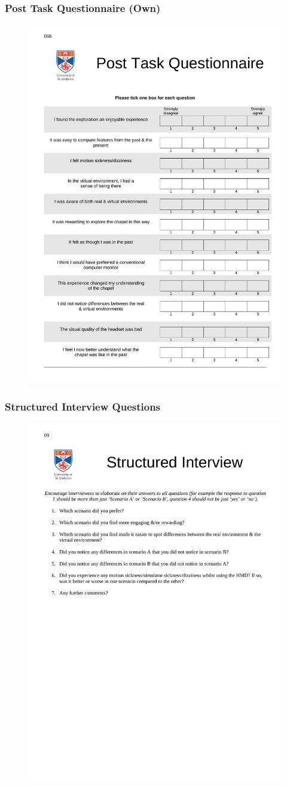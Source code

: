 \subsubsection{Post Task Questionnaire (Own)}
\label{12_questions}
\begin{figure}[h]
	\begin{center}
		\includegraphics[width=0.7\linewidth]{PDFs/Post_Task_Questionnaire_2.pdf}
	\end{center}
\end{figure}

\subsubsection{Structured Interview Questions}
\label{interview_questions}
\begin{figure}[h]
	\begin{center}
		\includegraphics[width=0.7\linewidth]{PDFs/Structured_Interview.pdf}
	\end{center}
\end{figure}